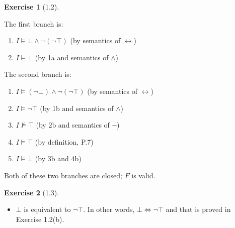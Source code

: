 \documentclass[12pt, psamsfonts]{amsart}
\theoremstyle{definition}
\newtheorem*{exer}{Exercise}
\theoremstyle{remark}
\numberwithin{equation}{subsection}
\begin{document}
\begin{exer}[1.2]
\begin{enumerate}[label=(\alph*)]
            The first branch is:
            \begin{enumerate}[label=\arabic*a.]
                \item %
                    $I \models \bot \land \neg (\neg \top)$ (by semantics of $\leftrightarrow$)
                \item %
                    $I \models \bot$ (by 1a and semantics of $\land$)
            \end{enumerate}

            The second branch is:
            \begin{enumerate}[label=\arabic*b.]
                \item %
                    $I \models (\neg \bot) \land \neg (\neg \top)$ (by semantics of $\leftrightarrow$)
                \item %
                    $I \models \neg\top$ (by 1b and semantics of $\land$)
                \item %
                    $I \not\models \top$ (by 2b and semantics of $\neg$)
                \item %
                    $I \models \top$ (by definition, P.7)
                \item %
                    $I \models \bot$ (by 3b and 4b)
            \end{enumerate}
            Both of these two branches are closed; $F$ is valid.
    \end{enumerate}
\end{exer}

\begin{exer}[1.3]
    $ $
    \begin{itemize}
        \item
            $\bot$ is equivalent to $\neg \top$.
            In other words, $\bot \Leftrightarrow \neg \top$ and that is proved in Exercise 1.2(b).
    \end{itemize}
\end{exer}
\end{document}
